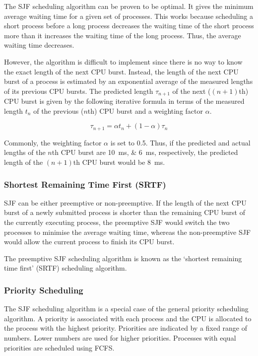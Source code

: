 The SJF scheduling algorithm can be proven to be optimal.
It gives the minimum average waiting time for a given set of processes.
This works because scheduling a short process before a long process decreases the waiting time of the short process more than it increases the waiting time of the long process.
Thus, the average waiting time decreases.

However, the algorithm is difficult to implement since there is no way to know the exact length of the next CPU burst.
Instead, the length of the next CPU burst of a process is estimated by an exponential average of the measured lengths of its previous CPU bursts.
The predicted length \( \tau_{n + 1} \) of the next (\( \left( n + 1 \right) \)th) CPU burst is given by the following iterative formula in terms of the measured length \( t_n \) of the previous (\( n \)th) CPU burst and a weighting factor \( \alpha \).

\begin{equation*}
  \tau_{n + 1} = \alpha t_n + \left( 1 - \alpha \right) \tau_n
\end{equation*}

Commonly, the weighting factor \( \alpha \) is set to \num{0.5}.
Thus, if the predicted and actual lengths of the \( n \)th CPU burst are \SIlist{10;6}{\milli\second}, respectively, the predicted length of the \( \left( n + 1 \right) \)th CPU burst would be \SI{8}{\milli\second}.

\subsubsection{Shortest Remaining Time First (SRTF)}

SJF can be either preemptive or non-preemptive.
If the length of the next CPU burst of a newly submitted process is shorter than the remaining CPU burst of the currently executing process, the preemptive SJF would switch the two processes to minimise the average waiting time, whereas the non-preemptive SJF would allow the current process to finish its CPU burst.

The preemptive SJF scheduling algorithm is known as the `shortest remaining time first' (SRTF) scheduling algorithm.

\subsubsection{Priority Scheduling}

The SJF scheduling algorithm is a special case of the general priority scheduling algorithm.
A priority is associated with each process and the CPU is allocated to the process with the highest priority.
Priorities are indicated by a fixed range of numbers.
Lower numbers are used for higher priorities.
Processes with equal priorities are scheduled using FCFS.

